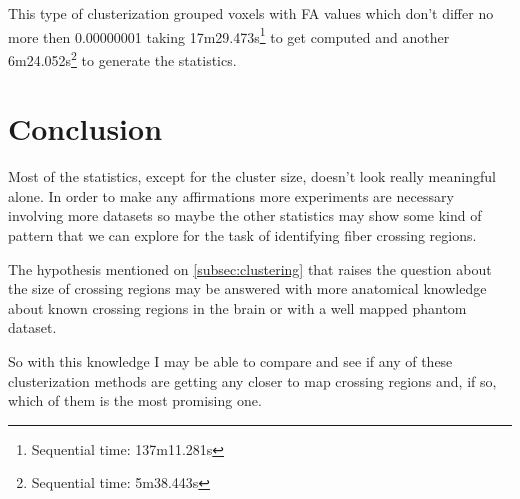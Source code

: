 \documentclass[a4paper,11pt]{report}
\begin{document}
    This type of clusterization grouped voxels with FA values which don't differ no more then 0.00000001 taking 17m29.473s\footnote{Sequential time: 137m11.281s} to get computed and another 6m24.052s\footnote{Sequential time: 5m38.443s} to generate the statistics.

\chapter{Conclusion}
Most of the statistics, except for the cluster size, doesn't look really meaningful alone. In order to make any affirmations more experiments are necessary involving more datasets so maybe the other statistics may show some kind of pattern that we can explore for the task of identifying fiber crossing regions.

The hypothesis mentioned on \ref{subsec:clustering} that raises the question about the size of crossing regions may be answered with more anatomical knowledge about known crossing regions in the brain or with a well mapped phantom dataset.

So with this knowledge I may be able to compare and see if any of these clusterization methods are getting any closer to map crossing regions and, if so, which of them is the most promising one.
\end{document}
